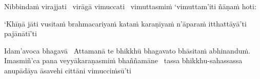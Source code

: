 \begin{pali-hang}
  Nibbindaṁ virajjati \breathmark\ virāgā vimuccati \breathmark\ vimuttasmiṁ `vimuttam'iti ñāṇaṁ hoti:
\end{pali-hang}

\begin{pali-hang}
  `Khīṇā jāti vusitaṁ brahmacariyaṁ kataṁ karaṇīyaṁ n'āparaṁ itthattāyā'ti pajānātī'ti
\end{pali-hang}

\begin{pali-hang}
  Idam'avoca bhagavā \breathmark\ Attamanā te bhikkhū bhagavato bhāsitaṁ abhinanduṁ. Imasmiñ'ca pana veyyākaraṇasmiṁ bhaññamāne \breathmark\ tassa bhikkhu-sahassassa anupādāya āsavehi cittāni vimucciṁsū'ti
\end{pali-hang}

\suttaRef{[SN 35.28]}


